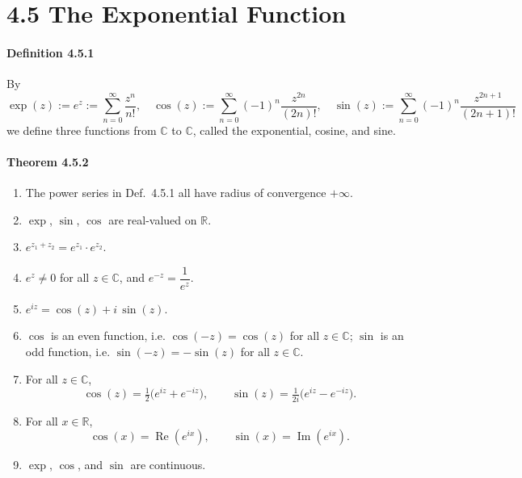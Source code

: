 \documentclass[12pt]{article}
\begin{document}
\section*{4.5 The Exponential Function}

\paragraph{Definition 4.5.1} By
\[
	\exp(z) := e^{z} := \sum_{n=0}^{\infty} \frac{z^{n}}{n!},\quad
	\cos(z) := \sum_{n=0}^{\infty} (-1)^n \frac{z^{2n}}{(2n)!},\quad
	\sin(z) := \sum_{n=0}^{\infty} (-1)^n \frac{z^{2n+1}}{(2n+1)!}
\]
we define three functions from $\mathbb C$ to $\mathbb C$, called the exponential, cosine, and sine.

\paragraph{Theorem 4.5.2}
\begin{enumerate}[label=({\arabic*})]
	\item The power series in Def.~4.5.1 all have radius of convergence $+\infty$.
	\item $\exp$, $\sin$, $\cos$ are real-valued on $\mathbb R$.
	\item $e^{z_1 + z_2} = e^{z_1}\cdot e^{z_2}$.
	\item $e^{z} \ne 0$ for all $z \in \mathbb C$, and $e^{-z} = \dfrac{1}{e^{z}}$.
	\item $e^{iz} = \cos(z) + i\,\sin(z)$.
	\item $\cos$ is an even function, i.e. $\cos(-z) = \cos(z)$ for all $z \in \mathbb C$; $\sin$ is an odd function, i.e. $\sin(-z) = -\sin(z)$ for all $z \in \mathbb C$.
	\item For all $z \in \mathbb C$,
	\[
		\cos(z) = \tfrac{1}{2}\bigl(e^{iz} + e^{-iz}\bigr),\qquad
		\sin(z) = \tfrac{1}{2i}\bigl(e^{iz} - e^{-iz}\bigr).
	\]
	\item For all $x \in \mathbb R$,
	\[
		\cos(x) = \operatorname{Re}(e^{ix}),\qquad \sin(x) = \operatorname{Im}(e^{ix}).
	\]
	\item $\exp$, $\cos$, and $\sin$ are continuous.
\end{enumerate}
\end{document}
